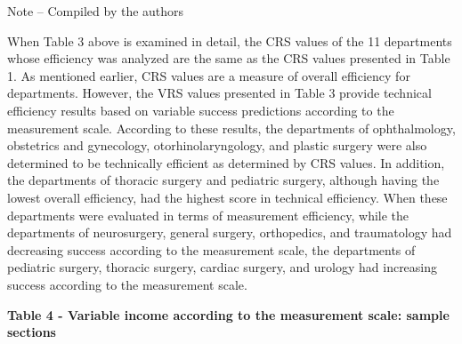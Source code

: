 Note -- Compiled by the authors

When Table 3 above is examined in detail, the CRS values
\hspace{0pt}\hspace{0pt}of the 11 departments whose efficiency was
analyzed are the same as the CRS values
\hspace{0pt}\hspace{0pt}presented in Table 1. As mentioned earlier, CRS
values \hspace{0pt}\hspace{0pt}are a measure of overall efficiency for
departments. However, the VRS values \hspace{0pt}\hspace{0pt}presented
in Table 3 provide technical efficiency results based on variable
success predictions according to the measurement scale. According to
these results, the departments of ophthalmology, obstetrics and
gynecology, otorhinolaryngology, and plastic surgery were also
determined to be technically efficient as determined by CRS values. In
addition, the departments of thoracic surgery and pediatric surgery,
although having the lowest overall efficiency, had the highest score in
technical efficiency. When these departments were evaluated in terms of
measurement efficiency, while the departments of neurosurgery, general
surgery, orthopedics, and traumatology had decreasing success according
to the measurement scale, the departments of pediatric surgery, thoracic
surgery, cardiac surgery, and urology had increasing success according
to the measurement scale.

{\bfseries Table 4 - Variable income according to the measurement scale:
sample sections}

